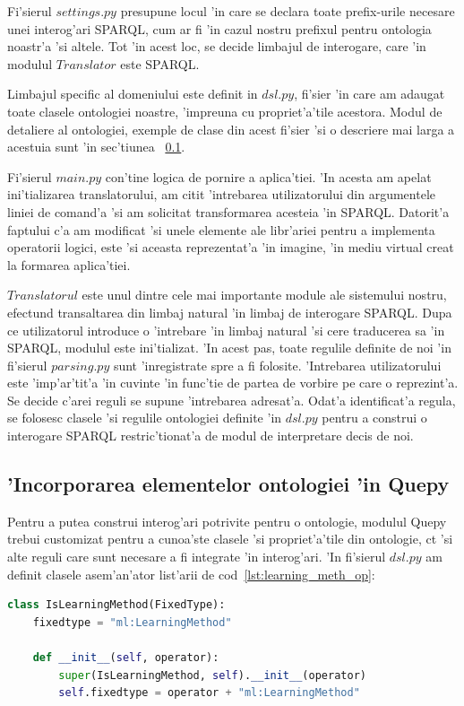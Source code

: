 \documentclass[12pt,a4paper,twoside]{report}
\begin{document}
Fi'sierul $settings.py$ presupune locul 'in care se declara toate prefix-urile necesare unei interog'ari SPARQL, cum ar fi 'in cazul nostru prefixul pentru ontologia noastr'a 'si altele. Tot 'in acest loc, se decide limbajul de interogare, care 'in modulul $Translator$ este SPARQL.

Limbajul specific al domeniului este definit in $dsl.py$, fi'sier 'in care am adaugat toate clasele ontologiei noastre, 'impreuna cu propriet'a'tile acestora. Modul de detaliere al ontologiei, exemple de clase din acest fi'sier 'si o descriere mai larga a acestuia sunt 'in sec'tiunea ~\ref{sec:dsl}. 

Fi'sierul $main.py$ con'tine logica de pornire a aplica'tiei. 'In acesta am apelat ini'tializarea translatorului, am citit 'intrebarea utilizatorului din argumentele liniei de comand'a 'si am solicitat transformarea acesteia 'in SPARQL. 
Datorit'a faptului c'a am modificat 'si unele elemente ale libr'ariei pentru a implementa operatorii logici, este 'si aceasta reprezentat'a 'in imagine, 'in mediu virtual creat la formarea aplica'tiei.

$Translatorul$ este unul dintre cele mai importante module ale sistemului nostru, efectu\ia nd transaltarea din limbaj natural 'in limbaj de interogare SPARQL. Dupa ce utilizatorul introduce o 'intrebare 'in limbaj natural 'si cere traducerea sa 'in SPARQL, modulul este ini'tializat. 'In acest pas, toate regulile definite de noi 'in fi'sierul $parsing.py$ sunt 'inregistrate spre a fi folosite. 
'Intrebarea utilizatorului este 'imp'ar'tit'a 'in cuvinte 'in func'tie de partea de vorbire pe care o reprezint'a. Se decide c'arei reguli se supune 'intrebarea adresat'a. Odat'a identificat'a regula, se folosesc clasele 'si regulile ontologiei definite 'in $dsl.py$ pentru a construi o interogare SPARQL restric'tionat'a de modul de interpretare decis de noi. 


\subsection{'Incorporarea elementelor ontologiei 'in Quepy}
\label{sec:dsl}

Pentru a putea construi interog'ari potrivite pentru o ontologie, modulul Quepy trebui customizat pentru a cunoa'ste clasele 'si propriet'a'tile din ontologie, c\ia t 'si alte reguli care sunt necesare a fi integrate 'in interog'ari. 'In fi'sierul $dsl.py$ am definit clasele asem'an'ator list'arii de cod~\ref{lst:learning_meth_op}: 
\begin{lstlisting}[basicstyle=\footnotesize, language = Python, label = lst:learning_meth_op, caption = Clasa LearningMethod]
   class IsLearningMethod(FixedType):
    fixedtype = "ml:LearningMethod"

    def __init__(self, operator):
        super(IsLearningMethod, self).__init__(operator)
        self.fixedtype = operator + "ml:LearningMethod"

\end{lstlisting}
\end{document}
